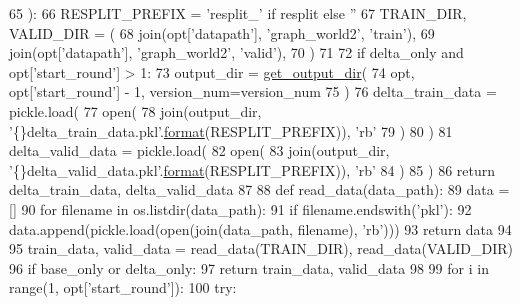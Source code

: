 \begin{DoxyCode}
65 ):
66     RESPLIT\_PREFIX = \textcolor{stringliteral}{'resplit\_'} \textcolor{keywordflow}{if} resplit \textcolor{keywordflow}{else} \textcolor{stringliteral}{''}
67     TRAIN\_DIR, VALID\_DIR = (
68         join(opt[\textcolor{stringliteral}{'datapath'}], \textcolor{stringliteral}{'graph\_world2'}, \textcolor{stringliteral}{'train'}),
69         join(opt[\textcolor{stringliteral}{'datapath'}], \textcolor{stringliteral}{'graph\_world2'}, \textcolor{stringliteral}{'valid'}),
70     )
71 
72     \textcolor{keywordflow}{if} delta\_only \textcolor{keywordflow}{and} opt[\textcolor{stringliteral}{'start\_round'}] > 1:
73         output\_dir = \hyperlink{namespaceprojects_1_1mastering__the__dungeon_1_1mturk_1_1tasks_1_1MTD_1_1run_a7f8196f264013bc16be3e85fe5c68f0d}{get\_output\_dir}(
74             opt, opt[\textcolor{stringliteral}{'start\_round'}] - 1, version\_num=version\_num
75         )
76         delta\_train\_data = pickle.load(
77             open(
78                 join(output\_dir, \textcolor{stringliteral}{'\{\}delta\_train\_data.pkl'}.\hyperlink{namespaceparlai_1_1chat__service_1_1services_1_1messenger_1_1shared__utils_a32e2e2022b824fbaf80c747160b52a76}{format}(RESPLIT\_PREFIX)), \textcolor{stringliteral}{'rb'}
79             )
80         )
81         delta\_valid\_data = pickle.load(
82             open(
83                 join(output\_dir, \textcolor{stringliteral}{'\{\}delta\_valid\_data.pkl'}.\hyperlink{namespaceparlai_1_1chat__service_1_1services_1_1messenger_1_1shared__utils_a32e2e2022b824fbaf80c747160b52a76}{format}(RESPLIT\_PREFIX)), \textcolor{stringliteral}{'rb'}
84             )
85         )
86         \textcolor{keywordflow}{return} delta\_train\_data, delta\_valid\_data
87 
88     \textcolor{keyword}{def }read\_data(data\_path):
89         data = []
90         \textcolor{keywordflow}{for} filename \textcolor{keywordflow}{in} os.listdir(data\_path):
91             \textcolor{keywordflow}{if} filename.endswith(\textcolor{stringliteral}{'pkl'}):
92                 data.append(pickle.load(open(join(data\_path, filename), \textcolor{stringliteral}{'rb'})))
93         \textcolor{keywordflow}{return} data
94 
95     train\_data, valid\_data = read\_data(TRAIN\_DIR), read\_data(VALID\_DIR)
96     \textcolor{keywordflow}{if} base\_only \textcolor{keywordflow}{or} delta\_only:
97         \textcolor{keywordflow}{return} train\_data, valid\_data
98 
99     \textcolor{keywordflow}{for} i \textcolor{keywordflow}{in} range(1, opt[\textcolor{stringliteral}{'start\_round'}]):
100         \textcolor{keywordflow}{try}:

\end{DoxyCode}
